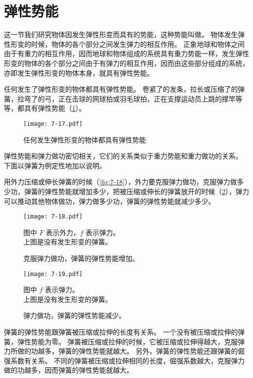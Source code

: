\section{弹性势能}
这一节我们研究物体因发生弹性形变而具有的势能，这种势能叫做。
物体发生弹性形变的时候，物体的各个部分之间发生弹力的相互作用。
正象地球和物体之间由于有重力的相互作用，因而地球和物体组成的系统具有重力势能一样，发生弹性形变的物体的各个部分之间由于有弹力的相互作用，因而由这些部分组成的系统，亦即发生弹性形变的物体本身，就具有弹性势能。

任何发生了弹性形变的物体都具有弹性势能。
卷紧了的发条，拉长或压缩了的弹簧，拉弯了的弓，正在击球的网球拍或羽毛球拍，正在支撑运动员上跳的撑竿等等，都具有弹性势能（\cref{fig:7-17}）。
\begin{figure}
  \texttt{[image: 7-17.pdf]}
  \caption{任何发生弹性形变的物体都具有弹性势能}\label{fig:7-17}
\end{figure}

弹性势能和弹力做功密切相关，它们的关系类似于重力势能和重力做功的关系。
下面以弹簧为例定性地加以说明。

用外力压缩或伸长弹簧的时候（\cref{fig:7-18}），外力要克服弹力做功，克服弹力做多少功，弹簧的弹性势能就增加多少，把被压缩或伸长的弹簧放开的时候（\cref{fig:7-19}），弹力可以推动其他物体做功，弹力做多少功，弹簧的弹性势能就减少多少。
\begin{figure}
  \begin{minipage}{0.55\linewidth}\centering
    \texttt{[image: 7-18.pdf]}
    {\par\footnotesize 图中 $F$ 表示外力，$f$ 表示弹力。\\上图是没有发生形变的弹簧。}
    \caption{克服弹力做功，弹簧的弹性势能增加。}\label{fig:7-18}
  \end{minipage}%
  \begin{minipage}{0.45\linewidth}\centering
    \texttt{[image: 7-19.pdf]}
    {\par\footnotesize 图中 $f$ 表示弹力。\\上图是没有发生形变的弹簧。}
    \caption{弹力做功，弹簧的弹性势能减少。}\label{fig:7-19}
  \end{minipage}
\end{figure}

弹簧的弹性势能跟弹簧被压缩或拉伸的长度有关系。
一个没有被压缩或拉伸的弹簧，弹性势能为零。
弹簧被压缩或拉伸的时候，它被压缩或拉伸得越大，克服弹力所做的功越多，弹簧的弹性势能就越大。
另外，弹簧的弹性势能还跟弹簧的倔强系数有关系。
不同的弹簧被压缩或拉伸相同的长度，倔强系数越大，克服弹力做的功越多，因而弹簧的弹性势能就越大。


